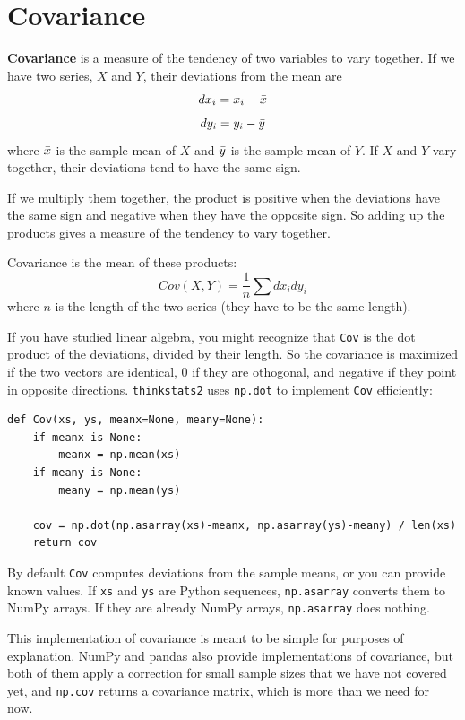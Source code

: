 \documentclass[12pt]{book}
\begin{document}
\section{Covariance}

{\bf Covariance} is a measure of the tendency of two variables
to vary together.  If we have two series, $X$ and $Y$, their
deviations from the mean are
%
\[ dx_i = x_i - \bar{x} \]
%
\[ dy_i = y_i - \bar{y} \]
%
where $\bar{x}$ is the sample mean of $X$ and $\bar{y}$ is the sample mean
of $Y$.  If $X$ and $Y$ vary together, their deviations tend to have
the same sign.

If we multiply them together, the product is positive when the
deviations have the same sign and negative when they have the opposite
sign.  So adding up the products gives a measure of the tendency to
vary together.

Covariance is the mean of these products:
%
\[ Cov(X,Y) = \frac{1}{n} \sum dx_i dy_i \]
%
where $n$ is the length of the two series (they have to be the same
length).

If you have studied linear algebra, you might recognize that
{\tt Cov} is the dot product of the deviations, divided
by their length.  So the covariance is maximized if the two vectors
are identical, 0 if they are othogonal, and negative if they
point in opposite directions.  {\tt thinkstats2} uses {\tt np.dot} to
implement {\tt Cov} efficiently:

\begin{verbatim}
def Cov(xs, ys, meanx=None, meany=None):
    if meanx is None:
        meanx = np.mean(xs)
    if meany is None:
        meany = np.mean(ys)

    cov = np.dot(np.asarray(xs)-meanx, np.asarray(ys)-meany) / len(xs)
    return cov
\end{verbatim}

By default {\tt Cov} computes deviations from the sample means,
or you can provide known values.  If {\tt xs} and {\tt ys} are
Python sequences, {\tt np.asarray} converts them to NumPy arrays.
If they are already NumPy arrays, {\tt np.asarray} does nothing.

This implementation of covariance is meant to be simple for purposes
of explanation.  NumPy and pandas also provide implementations of
covariance, but both of them apply a correction for small sample sizes
that we have not covered yet, and {\tt np.cov} returns a covariance
matrix, which is more than we need for now.
\end{document}
